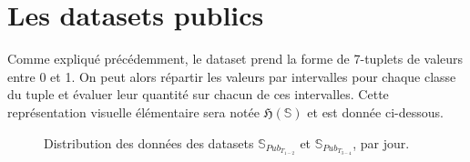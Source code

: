     \newpage\section{Les datasets publics}
        Comme expliqué précédemment, le dataset prend la forme de 7-tuplets de valeurs entre 0
        et 1. On peut alors répartir les valeurs par intervalles pour chaque classe du tuple et
        évaluer leur quantité sur chacun de ces intervalles. Cette représentation visuelle
        élémentaire sera notée $\mathfrak H\left(\mathbb S\right)$ et est donnée ci-dessous.
        \begin{figure}[H]
            \centering
            \qquad
            \caption{Distribution des données des datasets $\mathbb{S}_{Pub_{T_{1-2}}}$ et
                $\mathbb{S}_{Pub_{T_{3-4}}}$, par jour.}
        \end{figure}



